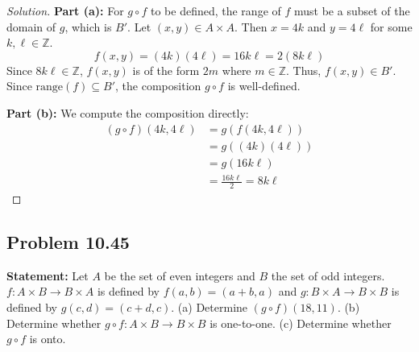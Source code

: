 \documentclass[11pt, a4paper]{article}
\theoremstyle{definition}
\theoremstyle{remark}
\newcommand{\Z}{\mathbb{Z}}
\begin{document}
\begin{proof}[Solution]
\textbf{Part (a):} For $g \circ f$ to be defined, the range of $f$ must be a subset of the domain of $g$, which is $B'$. Let $(x, y) \in A \times A$. Then $x = 4k$ and $y = 4\ell$ for some $k, \ell \in \Z$.
\[ f(x, y) = (4k)(4\ell) = 16k\ell = 2(8k\ell) \]
Since $8k\ell \in \Z$, $f(x, y)$ is of the form $2m$ where $m \in \Z$. Thus, $f(x, y) \in B'$. Since $\text{range}(f) \subseteq B'$, the composition $g \circ f$ is well-defined.

\textbf{Part (b):} We compute the composition directly:
\begin{align*}
    (g \circ f)(4k, 4\ell) &= g(f(4k, 4\ell)) \\
    &= g((4k)(4\ell)) \\
    &= g(16k\ell) \\
    &= \frac{16k\ell}{2} = 8k\ell
\end{align*}
\end{proof}

\subsection*{Problem 10.45}
\textbf{Statement:} Let $A$ be the set of even integers and $B$ the set of odd integers. $f: A \times B \to B \times A$ is defined by $f(a, b) = (a + b, a)$ and $g: B \times A \to B \times B$ is defined by $g(c, d) = (c + d, c)$.
(a) Determine $(g \circ f)(18, 11)$.
(b) Determine whether $g \circ f: A \times B \to B \times B$ is one-to-one.
(c) Determine whether $g \circ f$ is onto.
\end{document}
